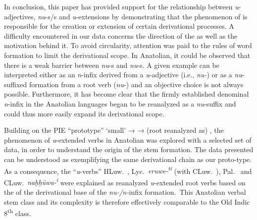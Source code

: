 \documentclass[output=paper,colorlinks,citecolor=brown]{langscibook}
\begin{document}
In conclusion, this paper has provided  support for the relationship between \textit{u}-adjectives, \textit{nu}-s/s and \textit{u}-extensions by demonstrating that the phenomenon of  is responsible for the creation or extension of certain derivational processes. A difficulty encountered in our data concerns the direction of the  as well as the motivation behind it. To avoid circularity, attention was paid to the rules of word formation to limit the derivational scope. In Anatolian, it could be observed that there is a weak barrier between \textit{nu}-s and \textit{nu}-s. A given example can be interpreted either as an \textit{n}-infix derived from a \textit{u}-adjective (i.e., \textit{nu\nobreakdash-}) or as a \textit{nu}-suffixed formation from a root verb (\textit{nu}-) and an objective choice is not always possible. Furthermore, it has become clear that the firmly established denominal \textit{n}-infix  in the Anatolian languages began to be reanalyzed as a \textit{nu}-suffix and could thus more easily expand its derivational scope.

Building on the PIE “prototype”  ‘small’ →  → (root reanalyzed as) , the phenomenon of \textit{u}-extended verbs  in Anatolian was explored with a selected set of data, in order to understand the origin of the stem formation. The data presented can be understood as exemplifying the same derivational chain as our proto-type. As a consequence, the “\textit{u}-verbs” HLuw.\ , Lyc.\ \textit{eruwe-\textsuperscript{ti}} (with CLuw.\ ), Pal.\  and CLuw.\ \textit{naḫḫūwa-\textsuperscript{i}} were explained as reanalyzed \textit{u}-extended root verbs based on the  of the derivational base of the \textit{nu-/n-}infix formation.\ This Anatolian verbal stem class and its complexity is therefore effectively comparable to the Old Indic 8\textsuperscript{th} class.
\end{document}
